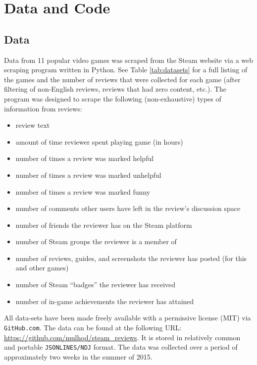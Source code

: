 \documentclass[9pt]{article}
\begin{document}
\section{Data and Code}
\label{sec:data_and_code}

\subsection{Data}
\label{ssec:data}

Data from 11 popular video games was scraped from the Steam website via a web scraping program written in Python. See Table \ref{tab:datasets} for a full listing of the games and the number of reviews that were collected for each game (after filtering of non-English reviews, reviews that had zero content, etc.). The program was designed to scrape the following (non-exhaustive) types of information from reviews:

\begin{itemize}
\item review text
\item amount of time reviewer spent playing game (in hours)
\item number of times a review was marked helpful
\item number of times a review was marked unhelpful
\item number of times a review was marked funny
\item number of comments other users have left in the review's discussion space
\item number of friends the reviewer has on the Steam platform
\item number of Steam groups the reviewer is a member of
\item number of reviews, guides, and screenshots the reviewer has posted (for this and other games)
\item number of Steam ``badges'' the reviewer has received
\item number of in-game achievements the reviewer has attained
\end{itemize}

All data-sets have been made freely available with a permissive license (MIT) via {\tt GitHub.com}. The data can be found at the following URL: \url{https://github.com/mulhod/steam_reviews}. It is stored in relatively common and portable {\tt JSONLINES/NDJ} format. The data was collected over a period of approximately two weeks in the summer of 2015.
\end{document}
